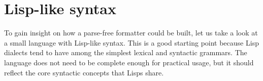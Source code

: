 \chapter{Lisp-like syntax}\label{chap:lisp-like}
To gain insight on how a parse-free formatter could be built,
let us take a look at a small language with Lisp-like syntax.
This is a good starting point because Lisp dialects tend to
have among the simplest lexical and syntactic grammars.
The language does not need to be complete enough for practical usage,
but it should reflect the core syntactic concepts that Lisps share.










